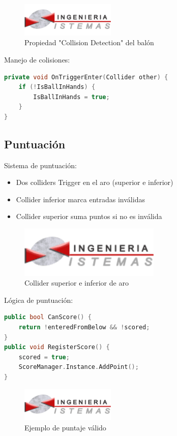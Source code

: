 \begin{figure}[h]
    \centering
    \includegraphics[width=0.4\textwidth]{img/epis.png}
    \caption{Propiedad "Collision Detection" del balón}
    \label{fig:collision}
\end{figure}

Manejo de colisiones:
\begin{lstlisting}[language=C++]
private void OnTriggerEnter(Collider other) {
    if (!IsBallInHands) {
        IsBallInHands = true;
    }
}
\end{lstlisting}

\subsection{Puntuación}
Sistema de puntuación:
\begin{itemize}
    \item Dos colliders Trigger en el aro (superior e inferior)
    \item Collider inferior marca entradas inválidas
    \item Collider superior suma puntos si no es inválida
\end{itemize}

\begin{figure}[h]
    \centering
    \includegraphics[width=0.6\textwidth]{img/epis.png}
    \caption{Collider superior e inferior de aro}
    \label{fig:aro}
\end{figure}

Lógica de puntuación:
\begin{lstlisting}[language=C++]
public bool CanScore() {
    return !enteredFromBelow && !scored;
}
public void RegisterScore() {
    scored = true;
    ScoreManager.Instance.AddPoint();
}
\end{lstlisting}

\begin{figure}[h]
    \centering
    \includegraphics[width=0.4\textwidth]{img/epis.png}
    \caption{Ejemplo de puntaje válido}
    \label{fig:valido}
\end{figure}

